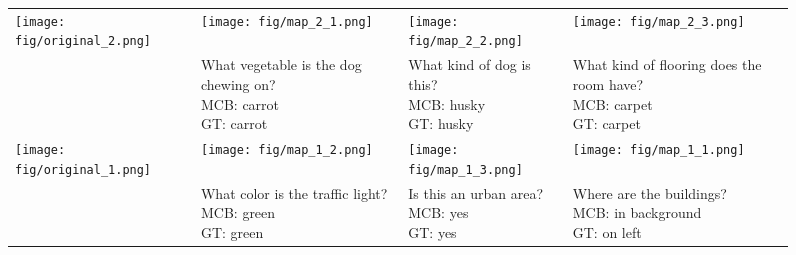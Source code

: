 \documentclass[11pt,letterpaper]{article}
\begin{document}
\begin{figure*}
\center
\begin{tabularx}{\textwidth}{XXXX}












\texttt{[image: fig/original\_2.png]} & 
\texttt{[image: fig/map\_2\_1.png]} &
\texttt{[image: fig/map\_2\_2.png]} &
\texttt{[image: fig/map\_2\_3.png]} \\
&
\small{What vegetable is the dog chewing on? \newline {\color{blue} MCB: carrot} \newline {\color{ForestGreen} GT: carrot}} &
\small{What kind of dog is this? \newline {\color{blue} MCB: husky} \newline {\color{ForestGreen} GT: husky}} &
\small{What kind of flooring does the room have? \newline {\color{blue} MCB: carpet} \newline {\color{ForestGreen} GT: carpet}} \\
\texttt{[image: fig/original\_1.png]} & 
\texttt{[image: fig/map\_1\_2.png]} &
\texttt{[image: fig/map\_1\_3.png]} &
\texttt{[image: fig/map\_1\_1.png]} \\
&
\small{What color is the traffic light? \newline {\color{blue} MCB: green} \newline {\color{ForestGreen} GT: green}} &
\small{Is this an urban area? \newline {\color{blue} MCB: yes} \newline {\color{ForestGreen} GT: yes}} &
\small{Where are the buildings? \newline {\color{blue} MCB: in background} \newline {\color{ForestGreen} GT: on left}} \\

\end{tabularx}
\end{figure*}
\end{document}
